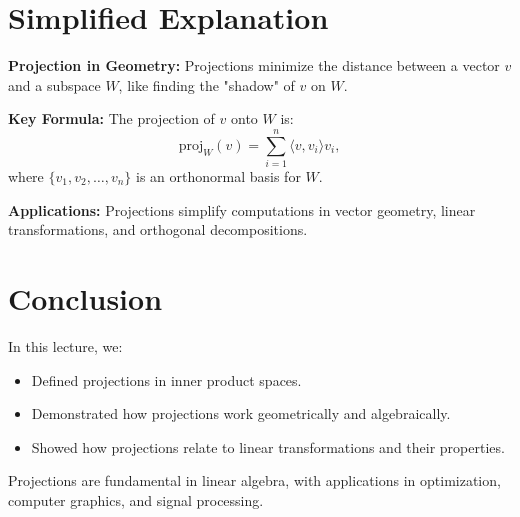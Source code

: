 \documentclass{article}
\begin{document}
\section*{Simplified Explanation}

\textbf{Projection in Geometry:}
Projections minimize the distance between a vector $v$ and a subspace $W$, like finding the "shadow" of $v$ on $W$.

\textbf{Key Formula:}
The projection of $v$ onto $W$ is:
\[
  \text{proj}_W(v) = \sum_{i=1}^n \langle v, v_i \rangle v_i,
\]
where $\{v_1, v_2, \dots, v_n\}$ is an orthonormal basis for $W$.

\textbf{Applications:}
Projections simplify computations in vector geometry, linear transformations, and orthogonal decompositions.

\section*{Conclusion}

In this lecture, we:
\begin{itemize}
  \item Defined projections in inner product spaces.
  \item Demonstrated how projections work geometrically and algebraically.
  \item Showed how projections relate to linear transformations and their properties.
\end{itemize}

Projections are fundamental in linear algebra, with applications in optimization, computer graphics, and signal processing.
\end{document}
